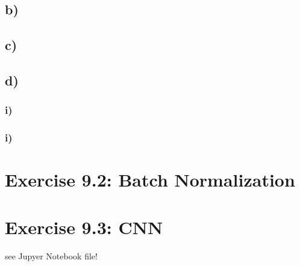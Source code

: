 \documentclass[a4paper]{article}
\begin{document}
    \subsection*{b)}
        

    \subsection*{c)}
        

    \subsection*{d)}
        \subsubsection*{i)}
            

        \subsubsection*{i)}
            



\newpage
\section*{Exercise 9.2: Batch Normalization}
    




\newpage
\section*{Exercise 9.3: CNN}
    see Jupyer Notebook file!
\end{document}
